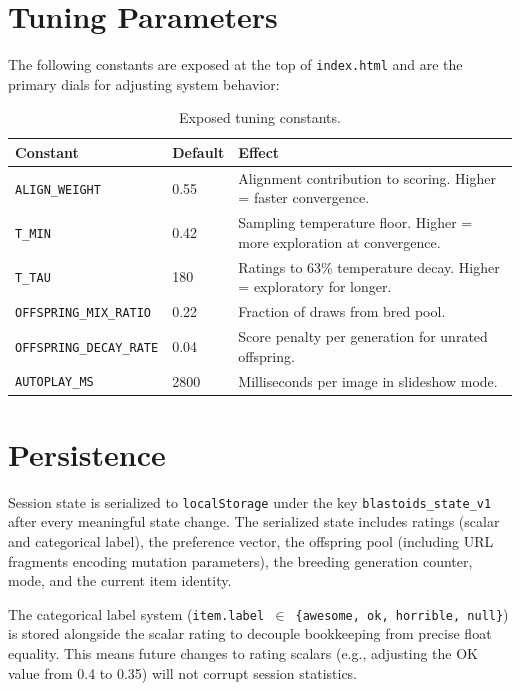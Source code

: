 \documentclass[12pt, a4paper]{article}
\begin{document}
\section{Tuning Parameters}

The following constants are exposed at the top of \texttt{index.html} and are the primary dials for adjusting system behavior:

\begin{table}[H]
\centering
\begin{tabular}{lll}
\toprule
\textbf{Constant} & \textbf{Default} & \textbf{Effect} \\
\midrule
\texttt{ALIGN\_WEIGHT} & 0.55 & Alignment contribution to scoring. Higher = faster convergence. \\
\texttt{T\_MIN} & 0.42 & Sampling temperature floor. Higher = more exploration at convergence. \\
\texttt{T\_TAU} & 180 & Ratings to 63\% temperature decay. Higher = exploratory for longer. \\
\texttt{OFFSPRING\_MIX\_RATIO} & 0.22 & Fraction of draws from bred pool. \\
\texttt{OFFSPRING\_DECAY\_RATE} & 0.04 & Score penalty per generation for unrated offspring. \\
\texttt{AUTOPLAY\_MS} & 2800 & Milliseconds per image in slideshow mode. \\
\bottomrule
\end{tabular}
\caption{Exposed tuning constants.}
\end{table}

\section{Persistence}

Session state is serialized to \texttt{localStorage} under the key \texttt{blastoids\_state\_v1} after every meaningful state change. The serialized state includes ratings (scalar and categorical label), the preference vector, the offspring pool (including URL fragments encoding mutation parameters), the breeding generation counter, mode, and the current item identity.

The categorical label system (\texttt{item.label $\in$ \{awesome, ok, horrible, null\}}) is stored alongside the scalar rating to decouple bookkeeping from precise float equality. This means future changes to rating scalars (e.g., adjusting the OK value from 0.4 to 0.35) will not corrupt session statistics.
\end{document}
